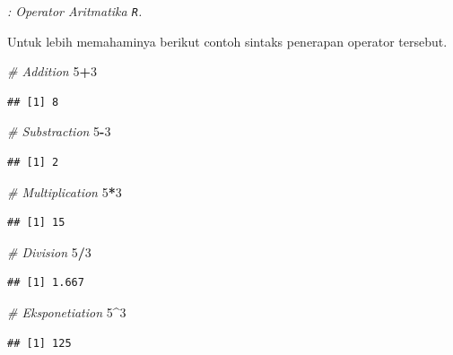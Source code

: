 \documentclass[]{book}
\newenvironment{Shaded}{\begin{snugshade}}{\end{snugshade}}
\newcommand{\DecValTok}[1]{\textcolor[rgb]{0.00,0.00,0.81}{#1}}
\newcommand{\CommentTok}[1]{\textcolor[rgb]{0.56,0.35,0.01}{\textit{#1}}}
\newcommand{\OperatorTok}[1]{\textcolor[rgb]{0.81,0.36,0.00}{\textbf{#1}}}
\begin{document}
\emph{: \label{tab:oparitmatika} Operator Aritmatika \texttt{R}.}

Untuk lebih memahaminya berikut contoh sintaks penerapan operator
tersebut.

\begin{Shaded}
\begin{Highlighting}[]
\CommentTok{# Addition}
\DecValTok{5}\OperatorTok{+}\DecValTok{3}
\end{Highlighting}
\end{Shaded}

\begin{verbatim}
## [1] 8
\end{verbatim}

\begin{Shaded}
\begin{Highlighting}[]
\CommentTok{# Substraction}
\DecValTok{5}\OperatorTok{-}\DecValTok{3}
\end{Highlighting}
\end{Shaded}

\begin{verbatim}
## [1] 2
\end{verbatim}

\begin{Shaded}
\begin{Highlighting}[]
\CommentTok{# Multiplication}
\DecValTok{5}\OperatorTok{*}\DecValTok{3}
\end{Highlighting}
\end{Shaded}

\begin{verbatim}
## [1] 15
\end{verbatim}

\begin{Shaded}
\begin{Highlighting}[]
\CommentTok{# Division}
\DecValTok{5}\OperatorTok{/}\DecValTok{3}
\end{Highlighting}
\end{Shaded}

\begin{verbatim}
## [1] 1.667
\end{verbatim}

\begin{Shaded}
\begin{Highlighting}[]
\CommentTok{# Eksponetiation}
\DecValTok{5}\OperatorTok{^}\DecValTok{3}
\end{Highlighting}
\end{Shaded}

\begin{verbatim}
## [1] 125
\end{verbatim}
\end{document}
